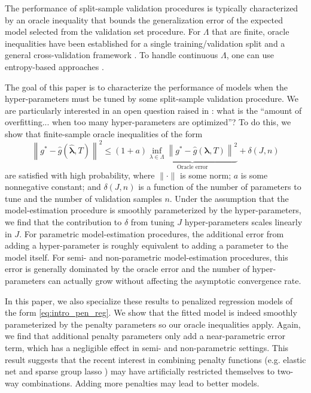 \documentclass[12pt]{article}
\begin{document}
The performance of split-sample validation procedures is typically characterized by an oracle inequality that bounds the generalization error of the expected model selected from the validation set procedure. For $\Lambda$ that are finite, oracle inequalities have been established for a single training/validation split \citet{gyorfi2006distribution} and a general cross-validation framework \citep{van2003unified, van2004asymptotic}. To handle continuous $\Lambda$, one can use entropy-based approaches \citep{lecue2012oracle}. 

The goal of this paper is to characterize the performance of models when the hyper-parameters must be tuned by some split-sample validation procedure. We are particularly interested in an open question raised in \citet{bengio2000gradient}: what is the ``amount of overfitting... when too many hyper-parameters are optimized''? To do this, we show that finite-sample oracle inequalities of the form
\begin{equation}
\label{thrm:intro_oracle_ineq}
\left \| g^* - \hat{g}\left (\hat{\boldsymbol{\lambda}}, T \right ) \right \|^2
\le
(1+a)
\underbrace{\inf_{\lambda \in \Lambda} \left \| g^* - \hat{g}\left (\boldsymbol{\lambda} , T \right ) \right \|^2}_{\text{Oracle error}}
+ \delta\left(J,n\right)
\end{equation}
are satisfied with high probability, where $\| \cdot \|$ is some norm; $a$ is some nonnegative constant; and $\delta(J,n)$ is a function of the number of parameters to tune and the number of validation samples $n$. Under the assumption that the model-estimation procedure is smoothly parameterized by the hyper-parameters, we find that the contribution to $\delta$ from tuning $J$ hyper-parameters scales linearly in $J$. For parametric model-estimation procedures, the additional error from adding a hyper-parameter is roughly equivalent to adding a parameter to the model itself. For semi- and non-parametric model-estimation procedures, this error is generally dominated by the oracle error and the number of hyper-parameters can actually grow without affecting the asymptotic convergence rate.

In this paper, we also specialize these results to penalized regression models of the form \eqref{eq:intro_pen_reg}. We show that the fitted model is indeed smoothly parameterized by the penalty parameters so our oracle inequalities apply. Again, we find that additional penalty parameters only add a near-parametric error term, which has a negligible effect in semi- and non-parametric settings. This result suggests that the recent interest in combining penalty functions (e.g. elastic net and sparse group lasso \citep{zou2003regression, simon2013sparse}) may have artificially restricted themselves to two-way combinations. Adding more penalties may lead to better models.
\end{document}
